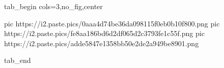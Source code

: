  
 
 
 
 


\ifcmt
  tab_begin cols=3,no_fig,center


		 pic https://i2.paste.pics/0aaa4d74be36da098115f0eb0b10f800.png
		 pic https://i2.paste.pics/fe8aa186bd6d2df065d2c3793fe1c55f.png
		 pic https://i2.paste.pics/adde5847e1358bb50e2de2a949be8901.png

  tab_end
\fi

